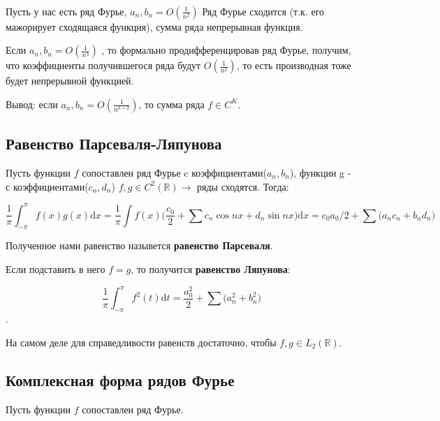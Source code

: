 \documentclass[12pt]{article}
\newcommand{\real}{\ensuremath{\mathbb{R}}}
\newcommand{\dd}{\ensuremath{\mathrm{d}}}
\begin{document}
\paragraph{}

Пусть у нас есть ряд Фурье,
$a_n, b_n = O(\frac{1}{n^2})$
Ряд Фурье сходится (т.к. его мажорирует сходящаяся функция), сумма ряда непрерывная функция.

Если 
$a_n, b_n = O(\frac{1}{n^3})$
, то
формально продифференцировав ряд Фурье, получим, что коэффициенты получившегося ряда будут $O(\frac{1}{n^2})$, то есть производная тоже будет непрерывной функцией.

\vspace{1em}

Вывод: если $a_n, b_n = O(\frac{1}{n^{k+2}})$, то сумма ряда $f \in C^K$.

\newpage

\subsection{Равенство Парсеваля-Ляпунова}

Пусть функции $f$ сопоставлен ряд Фурье c коэффициентами($a_n, b_n$), функции g - с коэффициентами($c_n, d_n$) 
$f, g \in C^2(\real) \rightarrow$ ряды сходятся.
Тогда:

$$ \frac{1}{\pi} \int_{-\pi}^{\pi}f(x)g(x) \dd x = \frac{1}{\pi} \int f(x) \big( \frac{c_0}{2} + \sum c_n \cos{nx} + d_n \sin{nx} \big) \dd x 
= c_0 a_0 / 2 + \sum \big( a_n c_n + b_n d_n \big) $$

Полученное нами равенство назывется \textbf{равенство Парсеваля}.

\vspace{1em}

Если подставить в него $f = g$, то получится \textbf{равенство Ляпунова}:

$$\frac{1}{\pi} \int_{-\pi}^{\pi} f^2(t) \dd t = \frac{a_0^2}{2} + \sum \big(a_n^2 + b_n^2 \big)$$.

\vspace{1em}

На самом деле для справедливости равенств достаточно, чтобы $f, g \in L_2(\real)$. 

\subsection{Комплексная форма рядов Фурье}

Пусть функции $f$ сопоставлен ряд Фурье.
\end{document}
